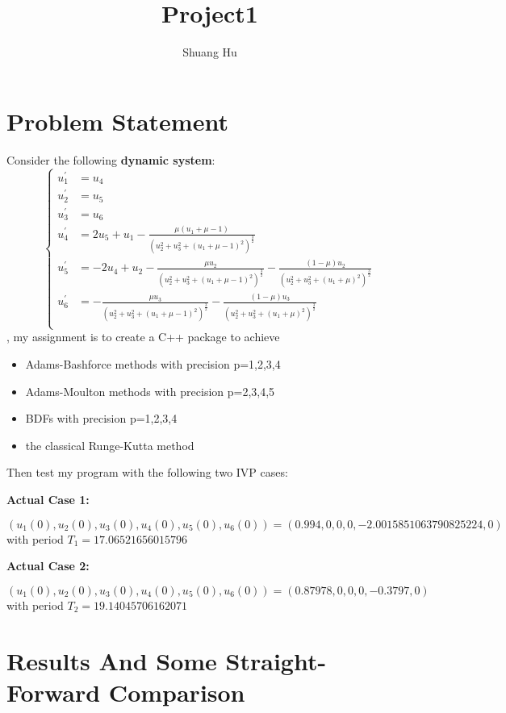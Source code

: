 \documentclass[UTF8]{ctexart}
\title{Project1}
\author{Shuang Hu}
\theoremstyle{plain}
\theoremstyle{definition}
\theoremstyle{remark}
\begin{document}
\maketitle
\section{Problem Statement}
Consider the following \textbf{dynamic system}:
$$
\left\{
\begin{aligned}
u_{1}^{'}&=u_{4}\\
u_{2}^{'}&=u_{5}\\
u_{3}^{'}&=u_{6}\\
u_{4}^{'}&=2u_{5}+u_{1}-\frac{\mu(u_{1}+\mu-1)}{(u_{2}^{2}+u_{3}^{2}+(u_{1}+\mu-1)^{2})^{\frac{3}{2}}}\\
u_{5}^{'}&=-2u_{4}+u_{2}-\frac{\mu u_{2}}{(u_{2}^{2}+u_{3}^{2}+(u_{1}+\mu-1)^{2})^{\frac{3}{2}}}-\frac{(1-\mu)u_{2}}{(u_{2}^{2}+u_{3}^{2}+(u_{1}+\mu)^{2})^{\frac{3}{2}}}\\
u_{6}^{'}&=-\frac{\mu u_{3}}{(u_{2}^{2}+u_{3}^{2}+(u_{1}+\mu-1)^{2})^{\frac{3}{2}}}-\frac{(1-\mu)u_{3}}{(u_{2}^{2}+u_{3}^{2}+(u_{1}+\mu)^{2})^{\frac{3}{2}}}\\
\end{aligned}
\right.
$$
, my assignment is to create a C++ package to achieve
\begin{itemize}
\item Adams-Bashforce methods with precision p=1,2,3,4
\item Adams-Moulton methods with precision p=2,3,4,5
\item BDFs with precision p=1,2,3,4
\item the classical Runge-Kutta method
\end{itemize}

Then test my program with the following two IVP cases:

\textbf{Actual Case 1:}

\begin{equation}
(u_{1}(0),u_{2}(0),u_{3}(0),u_{4}(0),u_{5}(0),u_{6}(0))=(0.994,0,0,0,-2.0015851063790825224,0)
\end{equation}
with period $T_{1}=17.06521656015796$

\textbf{Actual Case 2:}

\begin{equation}
(u_{1}(0),u_{2}(0),u_{3}(0),u_{4}(0),u_{5}(0),u_{6}(0))=(0.87978,0,0,0,-0.3797,0)
\end{equation}
with period $T_{2}=19.14045706162071$
\section{Results And Some Straight-Forward Comparison}
\end{document}
